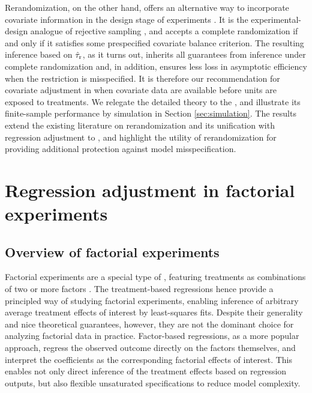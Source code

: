 \documentclass[11pt]{article}
\theoremstyle{definition}
\begin{document}
Rerandomization, on the other hand, offers an alternative way to incorporate covariate information in the design stage of experiments  \citep{cox:1982, morgan2012rerandomization}. It is the experimental-design analogue of rejective sampling \citep{fuller2009some}, and accepts a complete randomization if and only if it satisfies some prespecified covariate balance criterion.  The resulting inference based on $\hat\tau_{\textup{r}}$, as it turns out, inherits all guarantees from inference under complete randomization and, in addition, ensures less loss in asymptotic efficiency when the restriction is misspecified. It is therefore our recommendation for covariate adjustment in \mess when covariate data are available before units are exposed to treatments.  We relegate the detailed theory to the {\sm}, and illustrate its finite-sample performance by simulation in Section \ref{sec:simulation}.  The results extend  the existing literature on rerandomization and its unification with regression adjustment to \mess \citep{morgan2012rerandomization, branson, LD2018, AOS, LD20, ZDfrt}, 
and highlight the utility of rerandomization for providing additional protection against model misspecification.



\section{Regression adjustment in factorial experiments}\label{sec:factor}
\subsection{Overview of factorial experiments}
Factorial experiments are a special type of \mes, featuring treatments as combinations of two or more factors \citep{box, wh, DasFact15, ZDa, pashley2021causal}.  
The treatment-based regressions hence provide a principled way of studying factorial experiments, enabling inference of arbitrary average treatment effects of interest by least-squares fits. 
Despite their generality  and nice theoretical guarantees, however, they are not the dominant choice for analyzing factorial data in practice.
Factor-based regressions, as a more popular approach, regress the observed outcome directly on the factors themselves, and interpret the coefficients as the corresponding
factorial effects of interest.
This enables not only direct inference of the treatment effects based on regression outputs, but also flexible unsaturated
specifications to reduce model complexity.
\end{document}
